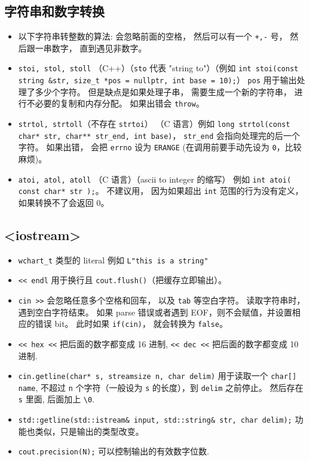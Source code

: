 \subsection{字符串和数字转换}
\begin{itemize}
\item 以下字符串转整数的算法: 会忽略前面的空格， 然后可以有一个 \verb`+,-` 号， 然后跟一串数字， 直到遇见非数字。
\item \verb`stoi, stol, stoll` （C++）（\verb`sto` 代表 "string to"）（例如 \verb`int stoi(const string &str, size_t *pos = nullptr, int base = 10);`） \verb`pos` 用于输出处理了多少个字符。 但是缺点是如果处理子串， 需要生成一个新的字符串， 进行不必要的复制和内存分配。 如果出错会 \verb`throw`。
\item \verb`strtol, strtoll`（不存在 \verb`strtoi`） （C 语言）例如 \verb`long strtol(const char* str, char** str_end, int base)`， \verb`str_end` 会指向处理完的后一个字符。 如果出错， 会把 \verb`errno` 设为 \verb`ERANGE` (在调用前要手动先设为 \verb`0`，比较麻烦)。
\item \verb`atoi, atol, atoll` （C 语言）（ascii to integer 的缩写） 例如 \verb`int atoi( const char* str );`。 不建议用， 因为如果超出 \verb`int` 范围的行为没有定义， 如果转换不了会返回 0。
\end{itemize}

\subsection{<iostream>}
\begin{itemize}
\item \verb`wchart_t` 类型的 literal 例如 \verb`L"this is a string"`
\item \verb`<< endl` 用于换行且 \verb`cout.flush()`（把缓存立即输出）。
\item \verb`cin >>` 会忽略任意多个空格和回车， 以及 \verb`tab` 等空白字符。 读取字符串时，遇到空白字符结束。 如果 parse 错误或者遇到 EOF，则不会赋值，并设置相应的错误 bit。 此时如果 \verb`if(cin)`， 就会转换为 \verb`false`。
\item \verb`<< hex <<` 把后面的数字都变成 16 进制, \verb`<< dec <<` 把后面的数字都变成 10 进制.
\item \verb`cin.getline(char* s, streamsize n, char delim)` 用于读取一个 \verb`char[] name`, 不超过 \verb`n` 个字符（一般设为 \verb`s` 的长度），到 \verb`delim` 之前停止。 然后存在 \verb`s` 里面, 后面加上 \verb`\0`.
\item \verb`std::getline(std::istream& input, std::string& str, char delim);` 功能也类似，只是输出的类型改变。
\item \verb`cout.precision(N);` 可以控制输出的有效数字位数.
\end{itemize}

